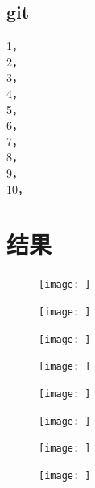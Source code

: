 \documentclass[UTF8]{ctexart}
\begin{document}
\subsection{git}
\begin{flushleft}
1，\\
2，\\
3，\\
4，\\
5，\\
6，\\
7，\\
8，\\
9，\\
10，\\
\end{flushleft}

\section{结果}

\begin{figure}[H]
    \centering
    \texttt{[image: ]}
    \caption{}
\end{figure}

\begin{figure}[H]
    \centering
    \texttt{[image: ]}
    \caption{}
\end{figure}

\begin{figure}[H]
    \centering
    \texttt{[image: ]}
    \caption{}
\end{figure}

\begin{figure}[H]
    \centering
    \texttt{[image: ]}
    \caption{}
\end{figure}

\begin{figure}[H]
    \centering
    \texttt{[image: ]}
    \caption{}
\end{figure}

\begin{figure}[H]
    \centering
    \texttt{[image: ]}
    \caption{}
\end{figure}

\begin{figure}[H]
    \centering
    \texttt{[image: ]}
    \caption{}
\end{figure}

\begin{figure}[H]
    \centering
    \texttt{[image: ]}
    \caption{}
\end{figure}
\end{document}
